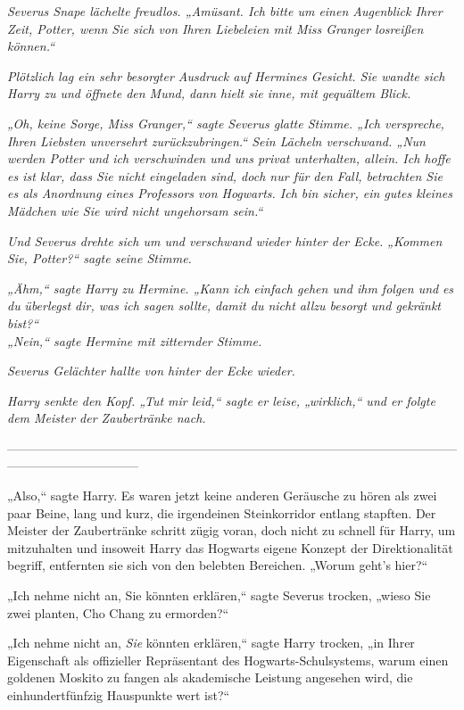 {\emph{Severus Snape lächelte freudlos. „Amüsant. Ich bitte um einen Augenblick Ihrer Zeit, Potter, wenn Sie sich von Ihren Liebeleien mit Miss Granger losreißen können.“}

\emph{Plötzlich lag ein sehr besorgter Ausdruck auf Hermines Gesicht. Sie wandte sich Harry zu und öffnete den Mund, dann hielt sie inne, mit gequältem Blick.}

\emph{„Oh, keine Sorge, Miss Granger,“ sagte Severus glatte Stimme. „Ich verspreche, Ihren Liebsten unversehrt zurückzubringen.“ Sein Lächeln verschwand. „Nun werden Potter und ich verschwinden und uns privat unterhalten, allein. Ich hoffe es ist klar, dass Sie nicht eingeladen sind, doch nur für den Fall, betrachten Sie es als Anordnung eines Professors von Hogwarts. Ich bin sicher, ein gutes kleines Mädchen wie Sie wird nicht ungehorsam sein.“}

\emph{Und Severus drehte sich um und verschwand wieder hinter der Ecke.} \emph{„Kommen Sie, Potter?“ sagte seine Stimme.}

\emph{„Ähm,“ sagte Harry zu Hermine. „Kann ich einfach gehen und ihm folgen und} \emph{es} \emph{\emph{du}} \emph{überlegst dir, was ich sagen sollte, damit du nicht allzu besorgt und gekränkt bist?“}\\ \emph{„Nein,“ sagte Hermine mit zitternder Stimme.}

\emph{Severus Gelächter hallte von hinter der Ecke wieder.}

\emph{Harry senkte den Kopf. „Tut mir leid,“ sagte er leise, „wirklich,“ und er folgte dem Meister der Zaubertränke nach.}

--------------------------------------------------------------------------------------------------------------------------------------------

„Also,“ sagte Harry. Es waren jetzt keine anderen Geräusche zu hören als zwei paar Beine, lang und kurz, die irgendeinen Steinkorridor entlang stapften. Der Meister der Zaubertränke schritt zügig voran, doch nicht zu schnell für Harry, um mitzuhalten und insoweit Harry das Hogwarts eigene Konzept der Direktionalität begriff, entfernten sie sich von den belebten Bereichen. „Worum geht's hier?“

„Ich nehme nicht an, Sie könnten erklären,“ sagte Severus trocken, „wieso Sie zwei planten, Cho Chang zu ermorden?“

„Ich nehme nicht an, \emph{Sie} könnten erklären,“ sagte Harry trocken, „in Ihrer Eigenschaft als offizieller Repräsentant des Hogwarts-Schulsystems, warum einen goldenen Moskito zu fangen als akademische Leistung angesehen wird, die einhundertfünfzig Hauspunkte wert ist?“

}
